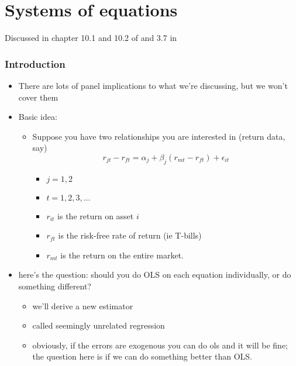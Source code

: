 
\part*{Systems of equations}%

Discussed in chapter 10.1 and 10.2 of \citet{Gre_2011} and 3.7 in
\citet{KlZ_2008}

\section{Introduction}

\begin{itemize}
\item There are lots of panel implications to what we're discussing,
      but we won't cover them
\item Basic idea:
\begin{itemize}
\item Suppose you have two relationships you are interested in
        (return data, say)
        \[r_{jt} - r_{ft} = \alpha_j + \beta_j (r_{mt} - r_{ft}) +
        \epsilon_{it}\]
\begin{itemize}
\item $j = 1,2$
\item $t = 1,2,3,\dots$
\item $r_{it}$ is the return on asset $i$
\item $r_{ft}$ is the risk-free rate of return (ie T-bills)
\item $r_{mt}$ is the return on the entire market.
\end{itemize}
\end{itemize}
\item here's the question: should you do OLS on each equation
      individually, or do something different?
\begin{itemize}
\item we'll derive a new estimator
\item called seemingly unrelated regression
\item obviously, if the errors are exogenous you can do ols and it
        will be fine; the question here is if we can do something
        better than OLS.
\end{itemize}
\end{itemize}

